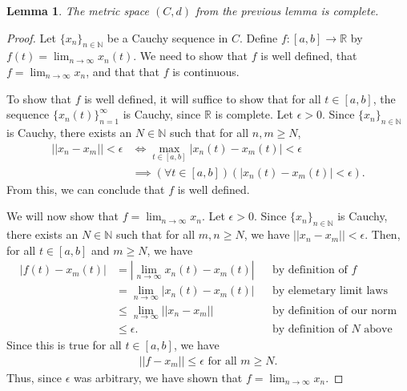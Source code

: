 \documentclass[10pt,a4paper]{article}
\theoremstyle{theorem}
\newtheorem{lemma}{Lemma}
\theoremstyle{definition}
\begin{document}
\begin{lemma}
The metric space $(C, d)$ from the previous lemma is complete.
\end{lemma}

\begin{proof}
Let $\{x_n\}_{n \in \mathbb{N}}$ be a Cauchy sequence in $C$.  Define $f:[a, b] \to \mathbb{R}$ by $f(t) = \lim_{n \to \infty} x_n(t)$. We need to show that $f$ is well defined,  that $f = \lim_{n \to \infty} x_n$, and that that $f$ is continuous.

To show that $f$ is well defined, it will suffice to show that for all $t \in [a, b]$, the sequence $\{x_n(t) \}_{n=1}^\infty$ is Cauchy, since $\mathbb{R}$ is complete. Let $\epsilon > 0$. Since $\{x_n\}_{n \in \mathbb{N}}$ is Cauchy, there exists an $N \in \mathbb{N}$ such that for all $n, m \geq N$,
\begin{align*}
||x_n - x_m|| < \epsilon &\iff \max_{t \in [a, b]} |x_n(t) - x_m(t)| < \epsilon\\
&\implies (\forall t \in [a, b])(|x_n(t) - x_m(t)| < \epsilon).
\end{align*}
From this, we can conclude that $f$ is well defined.

We will now show that $f = \lim_{n \to \infty} x_n$. Let $\epsilon >0$. Since $\{x_n\}_{n \in \mathbb{N}}$ is Cauchy, there exists an $N \in \mathbb{N}$ such that for all $m, n \geq N$, we have $||x_n - x_m|| < \epsilon$. Then, for all $t \in [a, b]$ and $m \geq N$, we have
\begin{align*}
|f(t) - x_m(t)| &= |\lim_{n \to \infty} x_n(t) - x_m(t)| && \text{by definition of } f\\
&= \lim_{n \to \infty}|x_n(t) - x_m(t)| && \text{by elemetary limit laws}\\
&\leq \lim_{n \to \infty}||x_n - x_m|| && \text{by definition of our norm}\\
&\leq \epsilon. && \text{by definition of } N \text{ above}
\end{align*}
Since this is true for all $t \in [a, b]$, we have
\begin{align*}
||f - x_m|| \leq \epsilon \text{ for all } m \geq N.
\end{align*} 
Thus, since $\epsilon$ was arbitrary, we have shown that $f = \lim_{n \to \infty} x_n$.


\end{proof}
\end{document}
